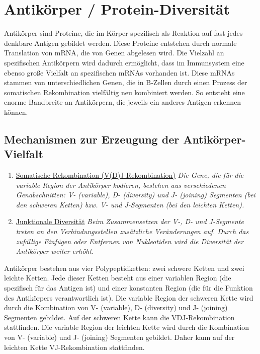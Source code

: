 \documentclass{article}
\begin{document}
\section{Antikörper / Protein-Diversität}
Antikörper sind Proteine, die im Körper spezifisch als Reaktion auf fast jedes denkbare Antigen gebildet werden. Diese Proteine entstehen durch normale Translation von mRNA, die von Genen abgelesen wird. Die Vielzahl an spezifischen Antikörpern wird dadurch ermöglicht, dass im Immunsystem eine ebenso große Vielfalt an spezifischen mRNAs vorhanden ist. Diese mRNAs stammen von unterschiedlichen Genen, die in B-Zellen durch einen Prozess der somatischen Rekombination vielfältig neu kombiniert werden. So entsteht eine enorme Bandbreite an Antikörpern, die jeweils ein anderes Antigen erkennen können. 
\subsection{Mechanismen zur Erzeugung der Antikörper-Vielfalt}
\begin{enumerate}
    \item \underline{Somatische Rekombination (V(D)J-Rekombination)} \newline
    \textit{Die Gene, die für die variable Region der Antikörper kodieren, bestehen aus verschiedenen Genabschnitten: V- (variable), D- (diversity) und J- (joining) Segmenten (bei den schweren Ketten) bzw. V- und J-Segmenten (bei den leichten Ketten).}
    \item \underline{Junktionale Diversität} \newline
    \textit{Beim Zusammensetzen der V-, D- und J-Segmente treten an den Verbindungsstellen zusätzliche Veränderungen auf. Durch das zufällige Einfügen oder Entfernen von Nukleotiden wird die Diversität der Antikörper weiter erhöht.}
\end{enumerate}
\begin{mybox}[title=Schwere und leichte Kette]
Antikörper bestehen aus vier Polypeptidketten: zwei schwere Ketten und zwei leichte Ketten. Jede dieser Ketten besteht aus einer variablen Region (die spezifisch für das Antigen ist) und einer konstanten Region (die für die Funktion des Antikörpers verantwortlich ist). \newline 
Die variable Region der schweren Kette wird durch die Kombination von V- (variable), D- (diversity) und J- (joining) Segmenten gebildet. Auf der schweren Kette kann die VDJ-Rekombination stattfinden.  \newline
Die variable Region der leichten Kette wird durch die Kombination von V- (variable) und J- (joining) Segmenten gebildet. Daher kann auf der leichten Kette VJ-Rekombination stattfinden. 
\end{mybox}
\end{document}
